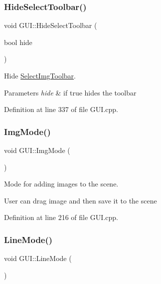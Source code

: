 \mbox{\label{classGUI_a7f6d3b1fcbd874fccd93c5f29c468ed8}} 
\subsubsection{\texorpdfstring{Hide\+Select\+Toolbar()}{HideSelectToolbar()}}
{\footnotesize\ttfamily void G\+U\+I\+::\+Hide\+Select\+Toolbar (\begin{DoxyParamCaption}\item[{bool}]{hide }\end{DoxyParamCaption})}



Hide \mbox{\hyperlink{structSelectImgToolbar}{Select\+Img\+Toolbar}}. 


\begin{DoxyParams}{Parameters}
{\em hide} & if true hides the toolbar \\
\hline
\end{DoxyParams}


Definition at line 337 of file G\+U\+I.\+cpp.

\mbox{\label{classGUI_a5281fa4256d3ff14df9a95c1c6613bb2}} 
\subsubsection{\texorpdfstring{Img\+Mode()}{ImgMode()}}
{\footnotesize\ttfamily void G\+U\+I\+::\+Img\+Mode (\begin{DoxyParamCaption}{ }\end{DoxyParamCaption})}



Mode for adding images to the scene. 

User can drag image and then save it to the scene 

Definition at line 216 of file G\+U\+I.\+cpp.

\mbox{\label{classGUI_a91fab5d31617ad5631d17dfceb5a0fad}} 
\subsubsection{\texorpdfstring{Line\+Mode()}{LineMode()}}
{\footnotesize\ttfamily void G\+U\+I\+::\+Line\+Mode (\begin{DoxyParamCaption}{ }\end{DoxyParamCaption})}




